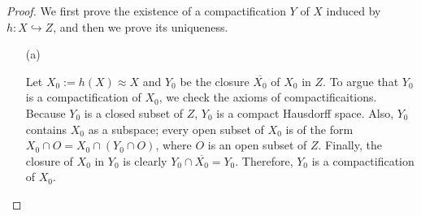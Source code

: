 \begin{proof}
    We first prove the existence of a compactification $Y$ of $X$ induced by $h: X\hookrightarrow Z$, and then we prove its uniqueness.
    \begin{enumerate}
        \item[(a)]
        {
            Let $X_0:=h(X)\approx X$ and $Y_0$ be the closure $\overline{X_0}$ of $X_0$ in $Z$.
            To argue that $Y_0$ is a compactification of $X_0$, we check the axioms of compactificaitions.
            Because $Y_0$ is a closed subset of $Z$, $Y_0$ is a compact Hausdorff space.
            Also, $Y_0$ contains $X_0$ as a subspace; every open subset of $X_0$ is of the form $X_0\cap O=X_0\cap(Y_0\cap O)$, where $O$ is an open subset of $Z$.
            Finally, the closure of $X_0$ in $Y_0$ is clearly $Y_0\cap\overline{X_0}=Y_0$.
            Therefore, $Y_0$ is a compactification of $X_0$.
            
}
\end{enumerate}
\end{proof}
